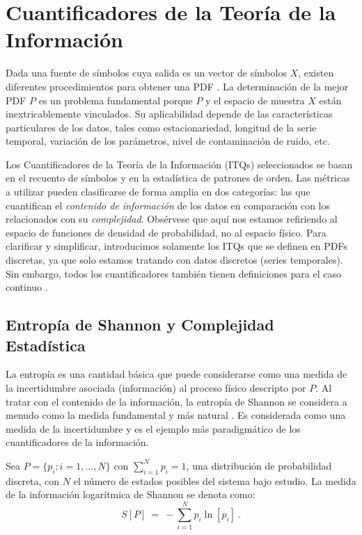 \section{Cuantificadores de la Teoría de la Información}
\label{sec:ITQs}

Dada una fuente de símbolos cuya salida es un vector de símbolos $X$, existen diferentes procedimientos para obtener una PDF \cite{Rosso2009, DeMicco2008, Mischaikow1999, Powell1979, Rosso2001, Pompe2002}.
La determinación de la mejor PDF $P$ es un problema fundamental porque $P$ y el espacio de muestra $X$ están inextricablemente vinculados.
Su aplicabilidad depende de las características particulares de los datos, tales como estacionariedad, longitud de la serie temporal, variación de los parámetros, nivel de contaminación de ruido, etc.

Los Cuantificadores de la Teoría de la Información (ITQs) seleccionados se basan en el recuento de símbolos y en la estadística de patrones de orden.
Las métricas a utilizar pueden clasificarse de forma amplia en dos categorías: las que cuantifican el \textit{contenido de información} de los datos en comparación con los relacionados con su \textit{complejidad}.
Obsérvese que aquí nos estamos refiriendo al espacio de funciones de densidad de probabilidad, no al espacio físico.
Para clarificar y simplificar, introducimos solamente los ITQs que se definen en PDFs discretas, ya que solo estamos tratando con datos discretos (series temporales).
Sin embargo, todos los cuantificadores también tienen definiciones para el caso continuo \cite{Shannon1948}.

\subsection{Entropía de Shannon y Complejidad Estadística}

La entropía es una cantidad básica que puede considerarse como una medida de la incertidumbre asociada (información) al proceso físico descripto por $P$.
Al tratar con el contenido de la información, la entropía de Shannon se considera a menudo como la medida fundamental y más natural \cite{Shannon1948}.
Es considerada como una medida de la incertidumbre y es el ejemplo más paradigmático de los cuantificadores de la información.

Sea $P=\{p_i; i=1,\ldots, N\}$ con $\sum_{i=1}^N p_i = 1$, una distribución de probabilidad discreta, con $N$ el número de estados posibles del sistema bajo estudio.
La medida de la información logarítmica de Shannon se denota como:
\begin{equation}
\label{Shannon-disc}
S[P] ~=~ -\sum_{i=1}^{N} p_i \ln \left[ p_i \right] \ .
\end{equation}

